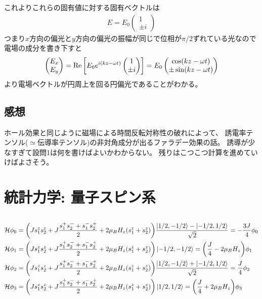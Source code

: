 \documentclass[../../master.tex]{subfiles}
\begin{document}
\subsection{}
これよりこれらの固有値に対する固有ベクトルは
\begin{align}
    E = E_0\begin{pmatrix}
        1\\ \pm i
    \end{pmatrix}
\end{align}
つまり\(x\)方向の偏光と\(y\)方向の偏光の振幅が同じで位相が\(\pi/2\)ずれている光なので
電場の成分を書き下すと
\begin{align}
    \begin{pmatrix}
        E_x\\E_y
    \end{pmatrix}
    =\Re \qty[E_0e^{i(kz-\omega t)}\begin{pmatrix}
        1 \\ \pm i
    \end{pmatrix}]
    =E_0\begin{pmatrix}
        \cos(kz-\omega t)\\
        \pm\sin(kz-\omega t)
    \end{pmatrix}
\end{align}
より電場ベクトルが円周上を回る円偏光であることがわかる。

\section*{感想}
ホール効果と同じように磁場による時間反転対称性の破れによって、
誘電率テンソル(\(\simeq\)伝導率テンソル)の非対角成分が出るファラデー効果の話。
誘導が少なすぎて設問1は何を書けばよいかわからない。
残りはこつこつ計算を進めていけばよさそう。

\chapter{統計力学: 量子スピン系}
\section{}
\begin{align}
    \mathcal{H}\phi_0
        &= \qty(Js_1^zs_2^z+J\frac{s_1^+s_2^-+s_1^-s_2^+}{2}+2\mu_BH_z(s_1^z+s_2^z))\frac{\ket{1/2,-1/2}-\ket{-1/2,1/2}}{\sqrt{2}}
        =-\frac{3J}{4}\phi_0\\
    \mathcal{H}\phi_1
        &= \qty(Js_1^zs_2^z+J\frac{s_1^+s_2^-+s_1^-s_2^+}{2}+2\mu_BH_z(s_1^z+s_2^z))\ket{-1/2,-1/2}
        =\qty(\frac{J}{4}-2\mu_B H_z)\phi_1\\
    \mathcal{H}\phi_2
        &= \qty(Js_1^zs_2^z+J\frac{s_1^+s_2^-+s_1^-s_2^+}{2}+2\mu_BH_z(s_1^z+s_2^z))\frac{\ket{1/2,-1/2}+\ket{-1/2,1/2}}{\sqrt{2}}
        =\frac{J}{4}\phi_2\\
    \mathcal{H}\phi_3
        &= \qty(Js_1^zs_2^z+J\frac{s_1^+s_2^-+s_1^-s_2^+}{2}+2\mu_BH_z(s_1^z+s_2^z))\ket{1/2,1/2}
        =\qty(\frac{J}{4}+2\mu_B H_z)\phi_3\\
\end{align}
\end{document}
